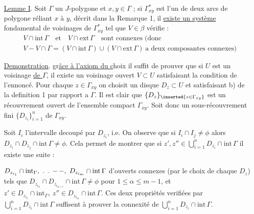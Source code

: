 %
\uline{Lemme I}. Soit $\Gamma$ un $J$-polygone et $x,y\in\Gamma$  ; si $\Gamma^{*}_{xy}$ est l'un de deux arcs de polygone réliant $x$ à $y$, décrit dans la Remarque 1, il \uline{existe un système} fondamental \inserted{$\beta$} de voisinages   de $\Gamma^{*}_{xy}$ tel que $V\in\beta$ vérifie :
\margin{$\cdot$}
\[
\begin{aligned}
&V\cap\mathrm{int}\,\Gamma\quad\text{et}\quad V\cap\mathrm{ext}\,\Gamma\quad\text{sont connexes (donc}\\
&V-V\cap\Gamma=(V\cap\mathrm{int}\,\Gamma)\cup(V\cap\mathrm{ext}\,\Gamma)\ \text{a deux composantes connexes)}
\end{aligned}
\]

\margin{!}\uline{Demonstration}. gr\uline{âce à l'axiom du c}hoix il suffit de prouver que si $U$ est un voisinage \uline{de $\Gamma$}, il existe un voisinage ouvert $V\subset U$ satisfaisant  la condition de l'ennoncé. Pour chaque $z\in\Gamma_{xy}$ on choisit un disque  $D_{z}\subset U$ et satisfaisant b) de la definition 1 par rapport a $\Gamma$. Il est clair que $\{D_{z}\}_{\inserted{z\in\Gamma_{xy}}}$ est un récouvrement ouvert de l'ensemble compact $\Gamma_{xy}$. Soit donc un sous-récouvrement fini $\{D_{z_{i}}\}^{n}_{i=1}$ de $\Gamma_{xy}$.

Soit $I_{i}$ l'intervalle  decoupé par $D_{z_{i}}$, i.e.  On observe que si $I_{i}\cap I_{j}\ne\phi$ alors $D_{z_{i}}\cap D_{z_{j}}\cap\mathrm{int}\,\Gamma\ne\phi$. Cela permet de montrer que si $z',z''\in\bigcup\limits_{i=1}^{n}D_{z_{i}}\cap\mathrm{int}\,\Gamma$ il existe une suite :

$D_{z_{i_{1}}}\cap\mathrm{int}_{\Gamma},\ \ldotp\;\ldotp\;-\,{-},\ D_{z_{i_{m}}}\cap\mathrm{int}\,\Gamma$ d'ouverts connexes (par le choix de chaque $D_{z}$) tels que $D_{z_{i_{\alpha}}}\cap D_{z_{i_{\alpha+1}}}\cap\mathrm{int}\,\Gamma\ne\phi$ pour $1\le\alpha\le m-1$, et $z'\in D_{z_{i_{1}}}\cap\mathrm{int}_{\Gamma},\ z''\in D_{z_{i_{m}}}\cap\mathrm{int}\,\Gamma$. Ces deux propriétés verifiées par $\bigcup\limits_{i=1}^{n}D_{z_{i}}\cap\mathrm{int}\,\Gamma$ suffisent à prouver la connexité de $\bigcup\limits_{i=1}^{n}D_{z_{i}}\cap\mathrm{int}\,\Gamma$.

